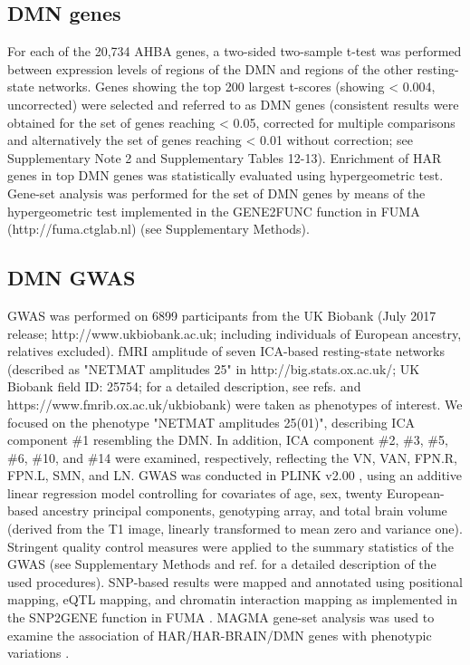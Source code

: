 \begin{refsection}
\subsection*{DMN genes}
For each of the 20,734 AHBA genes, a two-sided two-sample t-test was performed between expression levels of regions of the DMN and regions of the other resting-state networks. Genes showing the top 200 largest t-scores (showing \pval < 0.004, uncorrected) were selected and referred to as DMN genes (consistent results were obtained for the set of genes reaching \pval < 0.05, corrected for multiple comparisons and alternatively the set of genes reaching \pval < 0.01 without correction; see Supplementary Note 2 and Supplementary Tables 12-13). Enrichment of HAR genes in top DMN genes was statistically evaluated using hypergeometric test. Gene-set analysis was performed for the set of DMN genes by means of the hypergeometric test implemented in the GENE2FUNC function in FUMA (http://fuma.ctglab.nl) \citep{watanabe2017functional} (see Supplementary Methods).

\subsection*{DMN GWAS}
GWAS was performed on 6899 participants from the UK Biobank (July 2017 release; http://www.ukbiobank.ac.uk; including individuals of European ancestry, relatives excluded). fMRI amplitude of seven ICA-based resting-state networks (described as "NETMAT amplitudes 25" in http://big.stats.ox.ac.uk/; UK Biobank field ID: 25754; for a detailed description, see refs. \citep{Miller2016MultimodalPB,elliott2018genome} and https://www.fmrib.ox.ac.uk/ukbiobank) were taken as phenotypes of interest. We focused on the phenotype "NETMAT amplitudes 25(01)", describing ICA component \#1 resembling the DMN. In addition, ICA component \#2, \#3, \#5, \#6, \#10, and \#14 were examined, respectively, reflecting the VN, VAN, FPN.R, FPN.L, SMN, and LN. GWAS was conducted in PLINK v2.00 \citep{Purcell2007PLINKAT}, using an additive linear regression model controlling for covariates of age, sex, twenty European-based ancestry principal components, genotyping array, and total brain volume (derived from the T1 image, linearly transformed to mean zero and variance one). Stringent quality control measures were applied to the summary statistics of the GWAS (see Supplementary Methods and ref. \citep{Savage2018GenomewideAM} for a detailed description of the used procedures). SNP-based results were mapped and annotated using positional mapping, eQTL mapping, and chromatin interaction mapping as implemented in the SNP2GENE function in FUMA \citep{watanabe2017functional}. MAGMA gene-set analysis was used to examine the association of HAR/HAR-BRAIN/DMN genes with phenotypic variations \citep{watanabe2017functional,de2015magma}.


\end{refsection}
